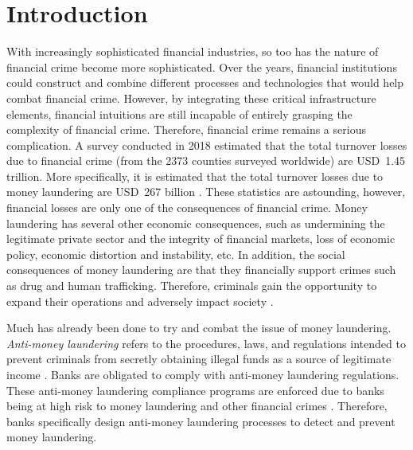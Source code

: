 \chapter{Introduction} \label{ch1_heading}

\startarabicpagenumbering %


With increasingly sophisticated financial industries, so too has the nature of financial crime become more sophisticated. Over the years, financial institutions could construct and combine different processes and technologies that would help combat financial crime. However, by integrating these critical infrastructure elements, financial intuitions are still incapable of entirely grasping the complexity of financial crime. Therefore, financial crime remains a serious complication. A survey conducted in 2018 estimated that the total turnover losses due to financial crime (from the 2373 counties surveyed worldwide) are USD\ 1.45 trillion. More specifically, it is estimated that the total turnover losses due to money laundering are USD\ 267 billion \citep*{begolli2019revealing}. These statistics are astounding, however, financial losses are only one of the consequences of financial crime. Money laundering has several other economic consequences, such as undermining the legitimate private sector and the integrity of financial markets, loss of economic policy, economic distortion and instability, etc. In addition, the social consequences of money laundering are that they financially support crimes such as drug and human trafficking. Therefore, criminals gain the opportunity to expand their operations and adversely impact society \citep*{mcdowell2001consequences}. 

Much has already been done to try and combat the issue of money laundering. \textit{Anti-money laundering} refers to the procedures, laws, and regulations intended to prevent criminals from secretly obtaining illegal funds as a source of legitimate income \citep*{kenton_2021}. Banks are obligated to comply with anti-money laundering regulations. These anti-money laundering compliance programs are enforced due to banks being at high risk to money laundering and other financial crimes \citep*{sanctionscanner}. Therefore, banks specifically design anti-money laundering processes to detect and prevent money laundering. 

